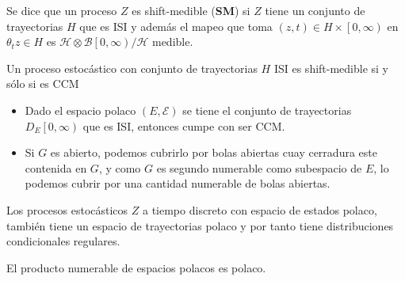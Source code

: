 \begin{Def}
Se dice que un proceso $Z$ es shift-medible (\textbf{SM}) si $Z$ tiene un conjunto de trayectorias $H$ que es ISI y adem\'as el mapeo que toma $\left(z,t\right)\in H\times\left[0,\infty\right)$ en $\theta_{t}z\in H$ es $\mathcal{H}\otimes\mathcal{B}\left[0,\infty\right)/\mathcal{H}$ medible.
\end{Def}

\begin{Note}
Un proceso estoc\'astico con conjunto de trayectorias $H$ ISI es shift-medible si y s\'olo si es CCM
\end{Note}

\begin{Note}
\begin{itemize}
\item Dado el espacio polaco $\left(E,\mathcal{E}\right)$ se tiene el  conjunto de trayectorias $D_{E}\left[0,\infty\right)$ que es ISI, entonces cumpe con ser CCM.

\item Si $G$ es abierto, podemos cubrirlo por bolas abiertas cuay cerradura este contenida en $G$, y como $G$ es segundo numerable como subespacio de $E$, lo podemos cubrir por una cantidad numerable de bolas abiertas.

\end{itemize}
\end{Note}


\begin{Note}
Los procesos estoc\'asticos $Z$ a tiempo discreto con espacio de estados polaco, tambi\'en tiene un espacio de trayectorias polaco y por tanto tiene distribuciones condicionales regulares.
\end{Note}

\begin{Teo}
El producto numerable de espacios polacos es polaco.
\end{Teo}


